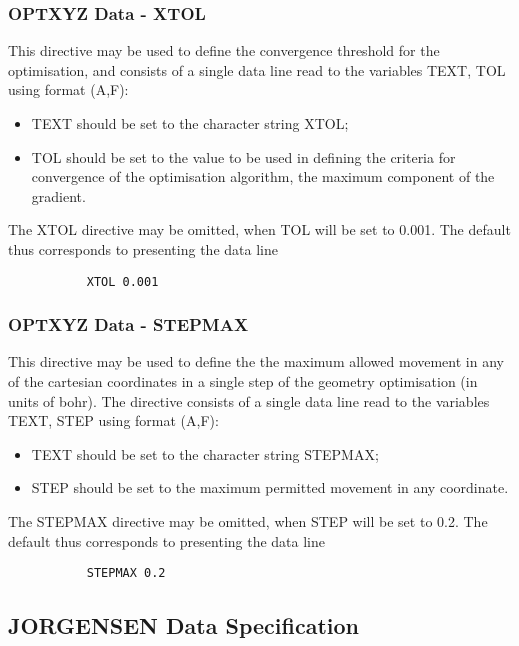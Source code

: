 \documentclass[11pt,fleqn]{article}
\begin{document}
\subsubsection[OPTXYZ Data - XTOL]{OPTXYZ Data - XTOL}

This directive may be used to define the convergence threshold
for the optimisation, and consists of a single data line
read to the variables TEXT, TOL using format (A,F):
\begin{itemize}
\item TEXT should be set to the character string XTOL;
\item TOL should be set to the value to be used in
defining the  criteria for convergence of the
optimisation algorithm, the maximum component of the gradient.
\end{itemize}
The XTOL directive may be omitted, when TOL will be set to 0.001.
The default thus corresponds to presenting the data line

{
\footnotesize
\begin{verbatim}
           XTOL 0.001
\end{verbatim}
}

\subsubsection[OPTXYZ Data - STEPMAX]{OPTXYZ Data - STEPMAX}

This directive may be used to define the 
the maximum allowed movement in any of the cartesian coordinates
in a single step of the geometry optimisation (in units of bohr).
The directive consists of a single data line
read to the variables TEXT, STEP using format (A,F):
\begin{itemize}
\item TEXT should be set to the character string STEPMAX;
\item STEP should be set to the maximum permitted movement
in any coordinate.
\end{itemize}
The STEPMAX directive may be omitted, when STEP will be set to 0.2.
The default thus corresponds to presenting the data line

{
\footnotesize
\begin{verbatim}
           STEPMAX 0.2
\end{verbatim}
}


\subsection[JORGENSEN Data Specification]{JORGENSEN Data Specification}
\end{document}
